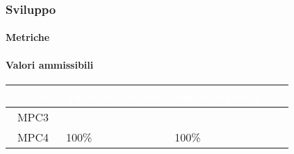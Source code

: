 \subsubsection{Sviluppo}

\paragraph{Metriche}

\paragraph{Valori ammissibili}
{
\renewcommand{\arraystretch}{1.5}
\centering
\begin{longtable}{c C{2.6cm} C{3cm} C{2.6cm} C{5cm}}
\textcolor{white}{\textbf{Metrica}}&
\textcolor{white}{\textbf{Valori accettabile}}&
\textcolor{white}{\textbf{Valore ottimale}}\\	
\endhead

MPC3 &   &  \\
MPC4 & 100\% & 100\%
\end{longtable}
}